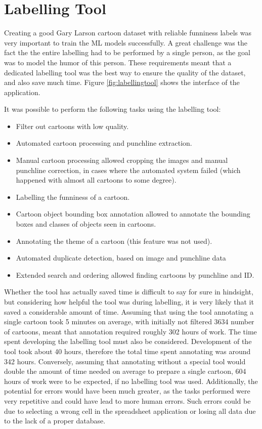 \documentclass[draft,final,oneside]{vutinfth} %
\begin{document}
\fi

\section{Labelling Tool}

Creating a good Gary Larson cartoon dataset with reliable funniness labels was very important to train the ML models successfully. A great challenge was the fact the the entire labelling had to be performed by a single person, as the goal was to model the humor of this person. These requirements meant that a dedicated labelling tool was the best way to ensure the quality of the dataset, and also save much time. Figure \ref{fig:labellingtool} shows the interface of the application.

It was possible to perform the following tasks using the labelling tool:
\begin{itemize}
\item Filter out cartoons with low quality.
\item Automated cartoon processing and punchline extraction.
\item Manual cartoon processing allowed cropping the images and manual punchline correction, in cases where the automated system failed (which happened with almost all cartoons to some degree).
\item  Labelling the funniness of a cartoon.
\item Cartoon object bounding box annotation allowed to annotate the bounding boxes and classes of objects seen in cartoons.
\item Annotating the theme of a cartoon (this feature was not used).
\item Automated duplicate detection, based on image and punchline data
\item Extended search and ordering allowed finding cartoons by punchline and ID.
\end{itemize}

Whether the tool has actually saved time is difficult to say for sure in hindsight, but considering how helpful the tool was during labelling, it is very likely that it saved a considerable amount of time. Assuming that using the tool annotating a single cartoon took 5 minutes on average, with initially not filtered 3634 number of cartoons, meant that annotation required roughly 302 hours of work. The time spent developing the labelling tool must also be considered. Development of the tool took about 40 hours, therefore the total time spent annotating was around 342 hours. Conversely, assuming that annotating without a special tool would double the amount of time needed on average to prepare a single cartoon, 604 hours of work were to be expected, if no labelling tool was used. Additionally, the potential for errors would have been much greater, as the tasks performed were very repetitive and could have lead to more human errors. Such errors could be due to selecting a wrong cell in the spreadsheet application or losing all data due to the lack of a proper database.
\end{document}
